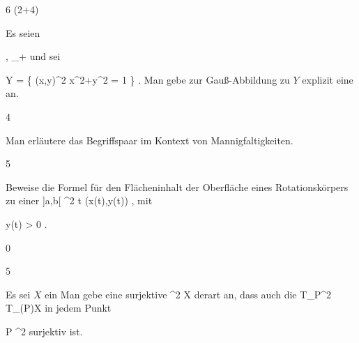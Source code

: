 {6 (2+4)}
{

Es seien

\mavergleichskette
{\vergleichskette
{ \alpha,\beta
}
{ \in }{ \R_+
}
{  }{
}
{    }{
}
{   }{
}
}
{}{}{}
und sei

\mavergleichskettedisp
{\vergleichskette
{ Y
}
{ =} { \left\{ (x,y)\in\R^2  \mid   \alpha x^2+\beta y^2 = 1        \right\}
}
{ } {
}
{ } {
}
{ } {
}
}
{}{}{.}
 { Man gebe zur Gauß-Abbildung zu $Y$ explizit eine
an.
}

}
{} {}

{4}
{

Man erläutere das Begriffspaar  im Kontext von Mannigfaltigkeiten.

}
{} {}

{5}
{

Beweise die Formel für den Flächeninhalt der Oberfläche eines Rotationskörpers zu einer
\maabbeledisp {\gamma} {]a,b[} {\R^2
} { t } {(x(t),y(t))
} {,}
mit

\mavergleichskette
{\vergleichskette
{ y(t)
}
{ > }{ 0
}
{  }{
}
{    }{
}
{   }{
}
}
{}{}{.}

}
{} {}

{0}
{

}
{} {}

{5}
{

Es sei $X$ ein
Man gebe eine surjektive
\maabbdisp {\varphi} {\R^2} {X
} {}
derart an, dass auch die
 { T_P\R^2 } { T_{\varphi(P)}X
} {}
in jedem Punkt

\mavergleichskette
{\vergleichskette
{ P
}
{ \in }{ \R^2
}
{  }{
}
{    }{
}
{   }{
}
}
{}{}{}
surjektiv ist.

}
{} {}


